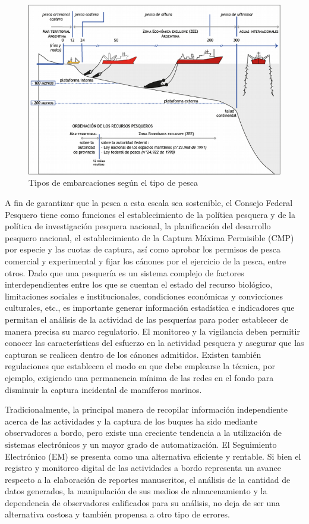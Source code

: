 \documentclass[11pt]{charter}
\begin{document}
\begin{figure}[htpb]
\centering 
\includegraphics[width=1.\textwidth]{./Figuras/tipo_embarcaciones.png}
\caption{Tipos de embarcaciones según el tipo de pesca}
\label{fig:tipo_embarcaciones}
\end{figure}

\vspace{25px}

A fin de garantizar que la pesca a esta escala sea sostenible, el Consejo Federal Pesquero tiene como funciones el establecimiento de la política pesquera y de la política de investigación pesquera nacional, la planificación del desarrollo pesquero nacional, el establecimiento de la Captura Máxima Permisible (CMP) por especie y las cuotas de captura, así como aprobar los permisos de pesca comercial y experimental y fijar los cánones por el ejercicio de la pesca, entre otros. 
Dado que una pesquería es un sistema complejo de factores interdependientes entre los que se cuentan el estado del recurso biológico, limitaciones sociales e institucionales, condiciones económicas y convicciones culturales, etc., es importante generar información estadística e indicadores que permitan el análisis de la actividad de las pesquerías para poder establecer de manera precisa su marco regulatorio.
El monitoreo y la vigilancia deben permitir conocer las características del esfuerzo en la actividad pesquera y asegurar que las capturan se realicen dentro de los cánones admitidos. Existen también regulaciones que establecen el modo en que debe emplearse la técnica, por ejemplo, exigiendo una permanencia mínima de las redes en el fondo para disminuir la captura incidental de mamíferos marinos.

Tradicionalmente, la principal manera de recopilar información independiente acerca de las actividades y la captura de los buques ha sido mediante observadores a bordo, pero existe una creciente tendencia a la utilización de sistemas electrónicos y un mayor grado de automatización.
El Seguimiento Electrónico (EM) se presenta como una alternativa eficiente y rentable.
Si bien el registro y monitoreo digital de las actividades a bordo representa un avance respecto a la elaboración de reportes manuscritos, el análisis de la cantidad de datos generados, la manipulación de sus medios de almacenamiento y la dependencia de observadores calificados para su análisis, no deja de ser una alternativa costosa y también propensa a otro tipo de errores.
\end{document}
